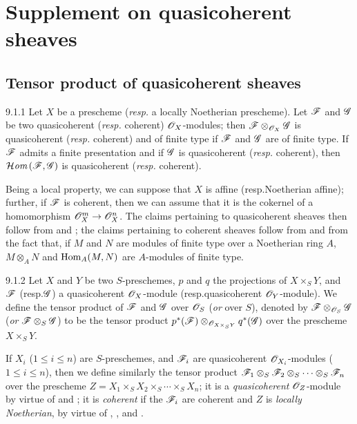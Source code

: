 \documentclass{book}
\begin{document}
\section{Supplement on quasicoherent sheaves}
\label{1-schemes-9}

\subsection{Tensor product of quasicoherent sheaves}
\label{1-schemes-9.1}

\begin{envs}[Proposition]{9.1.1}
\label{prop-1.9.1.1}
Let $X$ be a prescheme
(\emph{resp.} a locally Noetherian prescheme). Let $\mathscr{F}$ and $\mathscr{G}$
be two quasicoherent (\emph{resp.} coherent) $\mathscr{O}_X$-modules; then
$\mathscr{F}\otimes_{\mathscr{O}_X}\mathscr{G}$ is quasicoherent (\emph{resp.} coherent) and
of finite type if $\mathscr{F}$ and $\mathscr{G}$ are of finite type. If
$\mathscr{F}$ admits a finite presentation and if $\mathscr{G}$ is quasicoherent
(\emph{resp.} coherent), then $\mathcal{H}\textit{om}\,(\mathscr{F},\mathscr{G})$ is quasicoherent
(\emph{resp.} coherent).
\end{envs}

Being a local property, we can suppose that $X$ is affine (resp.Noetherian
affine); further, if $\mathscr{F}$ is coherent, then we can assume that it is the
cokernel of a homomorphism $\mathscr{O}_X^m\to\mathscr{O}_X^n$. The claims pertaining to
quasicoherent sheaves then follow from  and ; the
claims pertaining to coherent sheaves follow from  and from the fact
that, if $M$ and $N$ are modules of finite type over a Noetherian ring $A$,
$M\otimes_A N$ and ${\mathop{\mathrm{Hom}}\nolimits}_A(M,N)$ are $A$-modules of finite type.

\begin{env}[Definition]{9.1.2}
\label{defn-1.9.1.2}
Let $X$ and $Y$ be two $S$-preschemes, $p$ and
$q$ the projections of $X\times_S Y$, and $\mathscr{F}$ (resp.$\mathscr{G}$) a
quasicoherent $\mathscr{O}_X$-module (resp.quasicoherent $\mathscr{O}_Y$-module). We define the
tensor product of $\mathscr{F}$ and $\mathscr{G}$ over $\mathscr{O}_S$ (\emph{or} over $S$),
denoted by $\mathscr{F}\otimes_{\mathscr{O}_S}\mathscr{G}$ (\emph{or}
$\mathscr{F}\otimes_S\mathscr{G}$) to be the tensor product
$p^\ast(\mathscr{F})\otimes_{\mathscr{O}_{X\times_S Y}}q^\ast(\mathscr{G})$ over the
prescheme $X\times_S Y$.
\end{env}

If $X_i$ ($1\leq i\leq n$) are $S$-preschemes, and $\mathscr{F}_i$ are
quasicoherent $\mathscr{O}_{X_i}$-modules ($1\leq i\leq n$), then we define similarly the
tensor product
$\mathscr{F}_1\otimes_S\mathscr{F}_2\otimes_S\cdots\otimes_S\mathscr{F}_n$ over the
prescheme $Z=X_1\times_S X_2\times_S\cdots\times_S X_n$; it is a
\emph{quasicoherent} $\mathscr{O}_Z$-module by virtue of  and
; it is \emph{coherent} if the $\mathscr{F}_i$ are coherent and
$Z$ is \emph{locally Noetherian}, by virtue of ,
, and .
\end{document}
